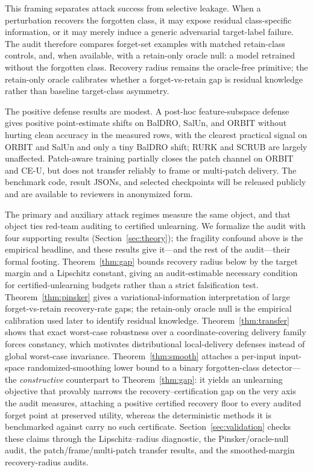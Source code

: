 \documentclass{article}
\begin{document}
This framing separates attack success from selective leakage. When a perturbation recovers the forgotten class, it may expose residual class-specific information, or it may merely induce a generic adversarial target-label failure. The audit therefore compares forget-set examples with matched retain-class controls, and, when available, with a retain-only oracle null: a model retrained without the forgotten class. Recovery radius remains the oracle-free primitive; the retain-only oracle calibrates whether a forget-vs-retain gap is residual knowledge rather than baseline target-class asymmetry.

The positive defense results are modest. A post-hoc feature-subspace defense gives positive point-estimate shifts on BalDRO, SalUn, and ORBIT without hurting clean accuracy in the measured rows, with the clearest practical signal on ORBIT and SalUn and only a tiny BalDRO shift; RURK and SCRUB are largely unaffected. Patch-aware training partially closes the patch channel on ORBIT and CE-U, but does not transfer reliably to frame or multi-patch delivery. The benchmark code, result JSONs, and selected checkpoints will be released publicly and are available to reviewers in anonymized form.

The primary and auxiliary attack regimes measure the same object, and that object ties red-team auditing to certified unlearning. We formalize the audit with four supporting results (Section~\ref{sec:theory}); the fragility confound above is the empirical headline, and these results give it---and the rest of the audit---their formal footing. Theorem~\ref{thm:gap} bounds recovery radius below by the target margin and a Lipschitz constant, giving an audit-estimable necessary condition for certified-unlearning budgets rather than a strict falsification test. Theorem~\ref{thm:pinsker} gives a variational-information interpretation of large forget-vs-retain recovery-rate gaps; the retain-only oracle null is the empirical calibration used later to identify residual knowledge. Theorem~\ref{thm:transfer} shows that exact worst-case robustness over a coordinate-covering delivery family forces constancy, which motivates distributional local-delivery defenses instead of global worst-case invariance. Theorem~\ref{thm:smooth} attaches a per-input input-space randomized-smoothing lower bound to a binary forgotten-class detector---the \emph{constructive} counterpart to Theorem~\ref{thm:gap}: it yields an unlearning objective that provably narrows the recovery--certification gap on the very axis the audit measures, attaching a positive certified recovery floor to every audited forget point at preserved utility, whereas the deterministic methods it is benchmarked against carry no such certificate. Section~\ref{sec:validation} checks these claims through the Lipschitz--radius diagnostic, the Pinsker/oracle-null audit, the patch/frame/multi-patch transfer results, and the smoothed-margin recovery-radius audits.
\end{document}
